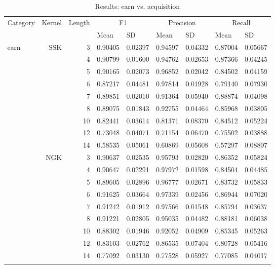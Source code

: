 \documentclass{article}
\theoremstyle{definition}
\begin{document}
\begin{table}[]
\centering
\caption{Results: earn vs. acquisition}
\label{}
\begin{tabular}{|l|r|r|r|r|r|r|r|r|}
\hline
\multicolumn{1}{|c|}{Category} & 
\multicolumn{1}{c|}{Kernel} & 
\multicolumn{1}{c|}{Length} & 
\multicolumn{2}{c|}{F1} & 
\multicolumn{2}{c|}{Precision} & 
\multicolumn{2}{c|}{Recall}\\
&
\multicolumn{1}{l|}{} & 
\multicolumn{1}{l|}{} & 
\multicolumn{1}{l|}{Mean} & \multicolumn{1}{l|}{SD} & \multicolumn{1}{l|}{Mean} & \multicolumn{1}{l|}{SD} & \multicolumn{1}{l|}{Mean} & \multicolumn{1}{l|}{SD} \\ \hline
\multirow{19}{*}{earn}  

& SSK & 3  &0.90405 &0.02397 &0.94597 &0.04332 &0.87004 &0.05667\\
&  & 4  &0.90799 &0.01600 &0.94762 &0.02653 &0.87366 &0.04245\\
&  & 5   &0.90165 &0.02073 &0.96852 &0.02042 &0.84502 &0.04159\\
&  & 6  &0.87217 &0.04481 &0.97814 &0.01928 &0.79140 &0.07930\\
&  & 7 &0.89851 &0.02010 &0.91364 &0.05940 &0.88874 &0.04098\\
&  & 8 &0.89075 &0.01843 &0.92755 &0.04464 &0.85968 &0.03805\\
&  & 10 &0.82441 &0.03614 &0.81371 &0.08370 &0.84512 &0.05224\\
&  & 12 &0.73048 &0.04071 &0.71154 &0.06470 &0.75502 &0.03888\\
&  & 14 &0.58535 &0.05061 &0.60869 &0.05608 &0.57297 &0.08807\\ \cline{2-9} 
   & NGK & 3   &0.90637 &0.02535 &0.95793 &0.02820 &0.86352 &0.05824\\
   &   & 4   &0.90647 &0.02291 &0.97972 &0.01598 &0.84504 &0.04485\\
   &   & 5   &0.89605 &0.02896 &0.96777 &0.02671 &0.83732 &0.05833\\
   &   & 6   &0.91625 &0.03664 &0.97339 &0.02456 &0.86944 &0.07020\\
   &   & 7   &0.91242 &0.01912 &0.97566 &0.01548 &0.85794 &0.03637\\
   &   & 8   &0.91221 &0.02805 &0.95035 &0.04482 &0.88181 &0.06038\\
   &   & 10  &0.88302 &0.01946 &0.92052 &0.04909 &0.85345 &0.05263\\
   &   & 12  &0.83103 &0.02762 &0.86535 &0.07404 &0.80728 &0.05416\\
   &   & 14  &0.77092 &0.03130 &0.77528 &0.05927 &0.77085 &0.04017\\ \cline{2-9} 

\end{tabular}
\end{table}
\end{document}
